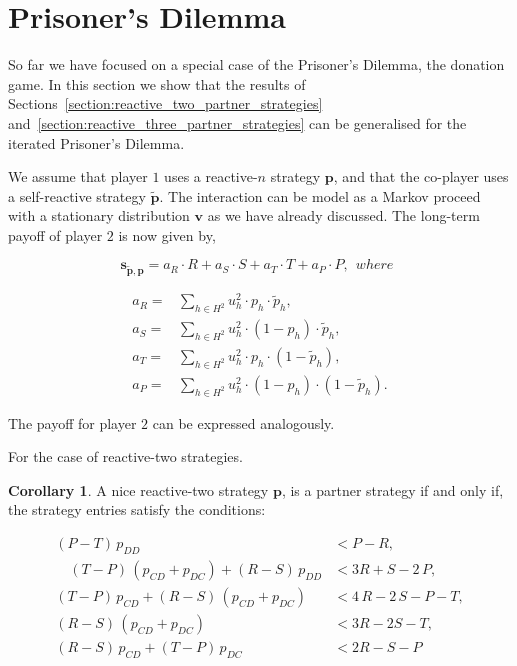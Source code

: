 \documentclass{article}
\theoremstyle{definition}
\newtheorem{corollary}{Corollary}[theorem]
\begin{document}
\section{Prisoner's Dilemma}

So far we have focused on a special case of the Prisoner's Dilemma, the donation
game. In this section we show that the results of Sections~\ref{section:reactive_two_partner_strategies}
and~\ref{section:reactive_three_partner_strategies} can be generalised
for the iterated Prisoner's Dilemma.

We assume that player $1$ uses a reactive-$n$ strategy \(\mathbf{p}\), and that
the co-player uses a self-reactive strategy \(\mathbf{\tilde{p}}\). The interaction
can be model as a Markov proceed with a stationary distribution \(\mathbf{v}\)
as we have already discussed. The long-term payoff of player $2$ is now given
by,

\begin{equation*}\label{eq:PD_long_term_payoff}
  \mathbf{s_{\mathbf{\tilde{p}}, \mathbf{p}}} = a_R \cdot R + a_S \cdot S + a_T \cdot T + a_P \cdot P, ~~where~~
\end{equation*}

\begin{equation*}
  \begin{array}{ll}
  a_R = & \displaystyle \sum_{h \in H^2} u^2_h \cdot p_h \cdot \tilde{p}_h, \\ [0.2cm]
  a_S = & \displaystyle \sum_{h \in H^2} u^2_h \cdot (1 - p_h) \cdot \tilde{p}_h, \\ [0.2cm]
  a_T = & \displaystyle \sum_{h \in H^2} u^2_h \cdot p_h \cdot (1 - \tilde{p}_h), \\ [0.2cm]
  a_P = &  \displaystyle \sum_{h \in H^2} u^2_h \cdot (1 - p_h) \cdot (1 - \tilde{p}_h).
\end{array}
\end{equation*}

The payoff for player $2$ can be expressed analogously.

For the case of reactive-two strategies.

\begin{corollary}\label{corollary:reactive_two_partner_strategies_PD}
A nice reactive-two strategy $\mathbf{p}$, is a partner strategy if and only if,
the strategy entries satisfy the conditions:

\begin{equation*}
  \begin{array}{rl}
    (P - T)\, p_{DD} & < P - R, \\ [0.2cm]
    \quad (T - P) \, (p_{CD} + p_{DC}) + (R - S)\,p_{DD} & < 3 R + S - 2\,P, \\ [0.2cm]
    (T - P)\, p_{CD} + (R - S)\, (p_{CD} + p_{DC}) & < 4\,R - 2\,S - P - T, \\ [0.2cm]
    (R - S)\,(p_{CD} + p_{DC}) & < 3 R - 2 S - T, \\ [0.2cm]
    \left(R - S\right)\, p_{CD} + \left(T - P\right)\,p_{DC} & < 2 R - S - P
\end{array}
\end{equation*}
\end{corollary}
\end{document}
